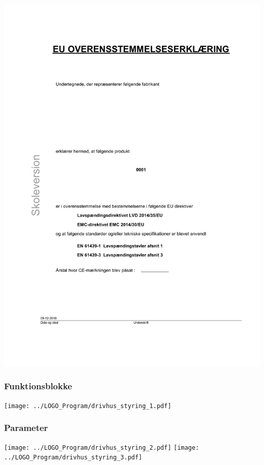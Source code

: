 \includegraphics[scale=0.72]{appendix/Drivhus_panel_13.pdf}
\subsubsection{Funktionsblokke}
\texttt{[image: ../LOGO\_Program/drivhus\_styring\_1.pdf]}
\subsubsection{Parameter}
\texttt{[image: ../LOGO\_Program/drivhus\_styring\_2.pdf]}
\newpage
\texttt{[image: ../LOGO\_Program/drivhus\_styring\_3.pdf]}
%